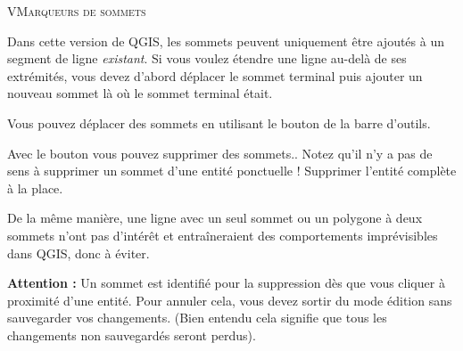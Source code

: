 \begin{itemize}
\begin{Tip}[ht]\caption{\textsc{VMarqueurs de sommets}}
\end{Tip}

Dans cette version de QGIS, les sommets peuvent uniquement être ajoutés à un segment de ligne \textit{existant}. Si vous voulez étendre une ligne au-delà de ses extrémités, vous devez d'abord déplacer le sommet terminal puis ajouter un nouveau sommet là où le sommet terminal était.

Vous pouvez déplacer des sommets en utilisant le bouton  de la barre d'outils.


Avec le bouton  vous pouvez supprimer des sommets.. Notez qu'il n'y a pas de sens à supprimer un sommet d'une entité ponctuelle ! Supprimer l'entité complète à la place.

De la même manière, une ligne avec un seul sommet ou un polygone à deux sommets n'ont pas d'intérêt et entraîneraient des comportements imprévisibles dans QGIS, donc à éviter. 

\textbf{Attention :} Un sommet est identifié pour la suppression dès que vous cliquer à proximité d'une entité. Pour annuler cela, vous devez sortir du mode édition sans sauvegarder vos changements. (Bien entendu cela signifie que tous les changements non sauvegardés seront perdus).


\end{itemize}
